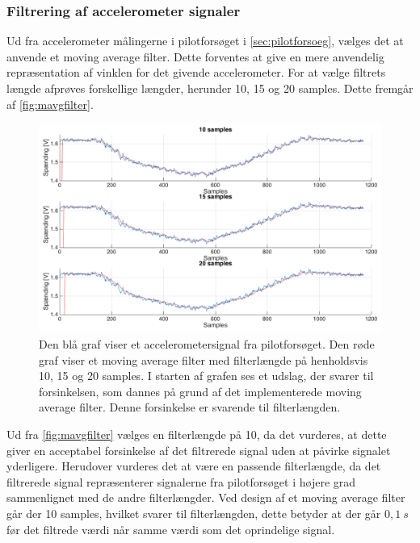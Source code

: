 \subsubsection{Filtrering af accelerometer signaler} \label{sec:mavg_krav}
Ud fra accelerometer målingerne i pilotforsøget i \autoref{sec:pilotforsoeg}, vælges det at anvende et moving average filter. Dette forventes at give en mere anvendelig repræsentation af vinklen for det givende accelerometer. For at vælge filtrets længde afprøves forskellige længder, herunder 10, 15 og 20 samples. Dette fremgår af \autoref{fig:mavgfilter}.


\begin{figure} [H]
\centering
\includegraphics[width=1\textwidth]{figures/problemloesning/mavgfilter_matlab} 
\caption{Den blå graf viser et accelerometersignal fra pilotforsøget. Den røde graf viser et moving average filter med filterlængde på henholdsvis 10, 15 og 20 samples. I starten af grafen ses et udslag, der svarer til forsinkelsen, som dannes på grund af det implementerede moving average filter. Denne forsinkelse er svarende til filterlængden.}
\label{fig:mavgfilter}
\end{figure}

Ud fra \autoref{fig:mavgfilter} vælges en filterlængde på 10, da det vurderes, at dette giver en acceptabel forsinkelse af det filtrerede signal uden at påvirke signalet yderligere. Herudover vurderes det at være en passende filterlængde, da det filtrerede signal repræsenterer signalerne fra pilotforsøget i højere grad sammenlignet med de andre filterlængder. Ved design af et moving average filter går der 10 samples, hvilket svarer til filterlængden, dette betyder at der går $0,1~s$ før det filtrede værdi når samme værdi som det oprindelige signal. 


